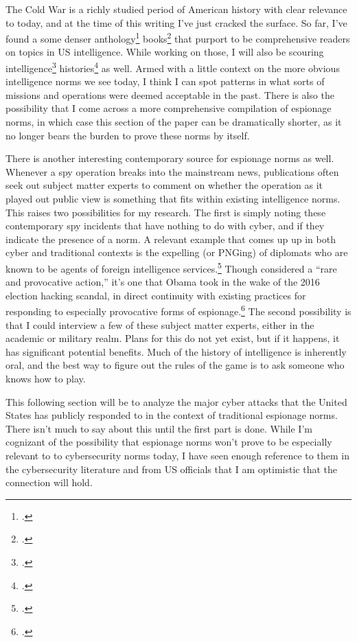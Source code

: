 \documentclass{report}
\begin{document}
\begin{refsegment}
The Cold War is a richly studied period of American history with clear relevance to today, and at the time of this writing I've just cracked the surface. So far, I've found a some denser anthology\footcite{andrew_secret_2009} books\footcite{johnson_intelligence_2015} that purport to be comprehensive readers on topics in US intelligence. While working on those, I will also be scouring intelligence\footcite{prados_william_2009} histories\footcite{prados_presidents_1996} as well. Armed with a little context on the more obvious intelligence norms we see today, I think I can spot patterns in what sorts of missions and operations were deemed acceptable in the past. There is also the possibility that I come across a more comprehensive compilation of espionage norms, in which case this section of the paper can be dramatically shorter, as it no longer bears the burden to prove these norms by itself.

There is another interesting contemporary source for espionage norms as well. Whenever a spy operation breaks into the mainstream news, publications often seek out subject matter experts to comment on whether the operation as it played out public view is something that fits within existing intelligence norms. This raises two possibilities for my research. The first is simply noting these contemporary spy incidents that have nothing to do with cyber, and if they indicate the presence of a norm. A relevant example that comes up up in both cyber and traditional contexts is the expelling (or PNGing) of diplomats who are known to be agents of foreign intelligence services.\footcite{risen_rules_2001} Though considered a ``rare and provocative action,'' it's one that Obama took in the wake of the 2016 election hacking scandal, in direct continuity with existing practices for responding to especially provocative forms of espionage.\footcite{mazzetti_game_2017} The second possibility is that I could interview a few of these subject matter experts, either in the academic or military realm. Plans for this do not yet exist, but if it happens, it has significant potential benefits. Much of the history of intelligence is inherently oral, and the best way to figure out the rules of the game is to ask someone who knows how to play.

This following section will be to analyze the major cyber attacks that the United States has publicly responded to in the context of traditional espionage norms. There isn't much to say about this until the first part is done. While I'm cognizant of the possibility that espionage norms won't prove to be especially relevant to to cybersecurity norms today, I have seen enough reference to them in the cybersecurity literature and from US officials that I am optimistic that the connection will hold.

\newpage
\printbibliography

\end{refsegment}
\end{document}
